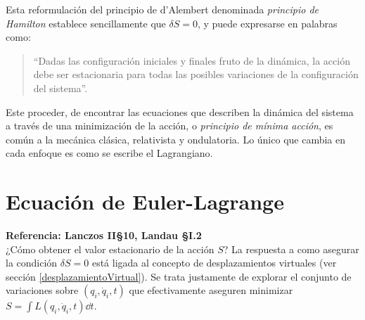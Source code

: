 \documentclass[12pt, spanish, a4paper, ]{article}
\begin{document}
Esta reformulación del principio de d'Alembert denominada \emph{principio de Hamilton} establece sencillamente que \(\delta S= 0\), y puede expresarse en palabras como:
\begin{quote}
``Dadas las configuración iniciales y finales fruto de la dinámica, la acción debe ser estacionaria para todas las posibles variaciones de la configuración del sistema''. 
\end{quote}

Este proceder, de encontrar las ecuaciones que describen la dinámica del sistema a través de una minimización de la acción, o \emph{principio de mínima acción}, es común a la mecánica clásica, relativista y ondulatoria.
Lo único que cambia en cada enfoque es como se escribe el Lagrangiano.


\section{Ecuación de Euler-Lagrange}\label{EulerLagrange} %
\textbf{Referencia: Lanczos II\S10, Landau \S I.2}\\
  


¿Cómo obtener el valor estacionario de la acción \(S\)?
La respuesta a como asegurar la condición \(\delta S= 0\) está ligada al concepto de desplazamientos virtuales (ver sección \ref{desplazamientoVirtual}).
Se trata justamente de explorar el conjunto de variaciones sobre \((q_i, \dot{q}_i, t)\) que efectivamente aseguren minimizar \(S= \int L(q_i, \dot{q}_i, t) \dd t\).
\end{document}
